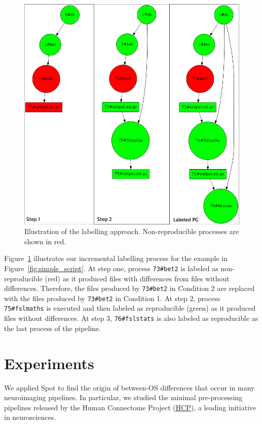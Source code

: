 \documentclass[a4paper,num-refs]{oup-contemporary}
\newcommand{\toolname}[0]{Spot\xspace}
\begin{document}
\begin{figure}
  \centering
  \includegraphics[width=.8\columnwidth]{images/labelling-process}
  \caption{Illustration of the labelling approach. Non-reproducible processes are shown in red.}
  \label{fig:iterations}
\end{figure}

Figure~\ref{fig:iterations} illustrates our incremental labelling 
process for the example in Figure~\ref{fig:simple_script}. 
At step one, process \texttt{73\#bet2} is labeled as non-reproducible (red) 
as it produced files with differences 
from files without differences. Therefore, the files produced by \texttt{73\#bet2} in  
Condition 2 are replaced with the files produced by \texttt{73\#bet2} in 
Condition 1.
At step 2, process \texttt{75\#fslmaths} is executed and then labeled 
as reproducible (green) as it produced files without differences.
At step 3, \texttt{76\#fslstats} is also labeled as 
reproducible as the last process of the pipeline.

\section{Experiments}

We applied \toolname to find the origin of between-OS differences that
occur in many neuroimaging pipelines. In particular, we studied the minimal
pre-processing pipelines released by the Human Connectome Project
(\href{https://www.humanconnectome.org}{HCP}), a leading initiative in
neurosciences. 
\end{document}
